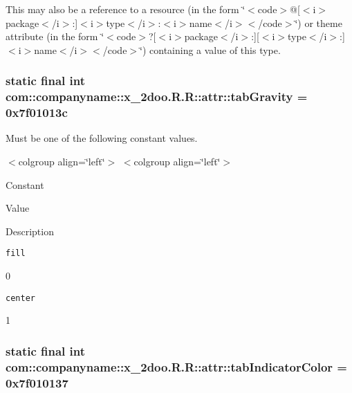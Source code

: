 This may also be a reference to a resource (in the form \char`\"{}$<$code$>$@\mbox{[}$<$i$>$package$<$/i$>$:\mbox{]}$<$i$>$type$<$/i$>$:$<$i$>$name$<$/i$>$$<$/code$>$\char`\"{}) or theme attribute (in the form \char`\"{}$<$code$>$?\mbox{[}$<$i$>$package$<$/i$>$:\mbox{]}\mbox{[}$<$i$>$type$<$/i$>$:\mbox{]}$<$i$>$name$<$/i$>$$<$/code$>$\char`\"{}) containing a value of this type. \hypertarget{classcom_1_1companyname_1_1x__2doo_1_1_r_1_1attr_a4433cf108f3949506446230cf07dead}{
\subsubsection[{tabGravity}]{\setlength{\rightskip}{0pt plus 5cm}static final int com::companyname::x\_\-2doo.R.R::attr::tabGravity = 0x7f01013c}}
\label{classcom_1_1companyname_1_1x__2doo_1_1_r_1_1attr_a4433cf108f3949506446230cf07dead}


Must be one of the following constant values. \begin{TabularC}{0}
\hline
\end{TabularC}
$<$colgroup align=\char`\"{}left\char`\"{}$>$ $<$colgroup align=\char`\"{}left\char`\"{}$>$ 

Constant

Value

Description 

{\tt fill}

0

{\tt center}

1\hypertarget{classcom_1_1companyname_1_1x__2doo_1_1_r_1_1attr_726a6d346a595d9583fbbdac9cee3ddc}{
\subsubsection[{tabIndicatorColor}]{\setlength{\rightskip}{0pt plus 5cm}static final int com::companyname::x\_\-2doo.R.R::attr::tabIndicatorColor = 0x7f010137}}
\label{classcom_1_1companyname_1_1x__2doo_1_1_r_1_1attr_726a6d346a595d9583fbbdac9cee3ddc}


